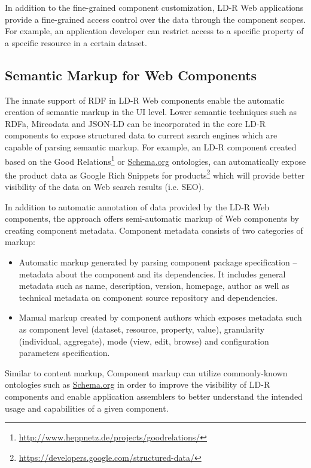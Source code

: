 \documentclass{acm_proc_article-sp}
\begin{document}
In addition to the fine-grained component customization, LD-R Web applications provide a fine-grained access control over the data through the component scopes.
For example, an application developer can restrict access to a specific property of a specific resource in a certain dataset.

\subsection{Semantic Markup for Web Components}
\label{sec:markup}
The innate support of RDF in LD-R Web components enable the automatic creation of semantic markup in the UI level.
Lower semantic techniques such as RDFa, Mircodata and JSON-LD can be incorporated in the core LD-R components to expose structured data to current search engines which are capable of parsing semantic markup.
For example, an LD-R component created based on the Good Relations\footnote{\url{http://www.heppnetz.de/projects/goodrelations/}} or \url{Schema.org} ontologies, can automatically expose the product data as Google Rich Snippets for products\footnote{\url{https://developers.google.com/structured-data/}} which will provide better visibility of the data on Web search results (i.e. SEO).

In addition to automatic annotation of data provided by the LD-R Web components, the approach offers semi-automatic markup of Web components by creating component metadata. 
Component metadata consists of two categories of markup:
\begin{itemize}
\item Automatic markup generated by parsing component package specification -- metadata about the component and its dependencies. It includes general metadata such as name, description, version, homepage, author as well as technical metadata on component source repository and dependencies.

\item Manual markup created by component authors which exposes metadata such as component level (dataset, resource, property, value), granularity (individual, aggregate), mode (view, edit, browse) and configuration parameters specification.

\end{itemize}

Similar to content markup, Component markup can utilize commonly-known ontologies such as \url{Schema.org} in order to improve the visibility of LD-R components and enable application assemblers to better understand the intended usage and capabilities of a given component.
\end{document}
